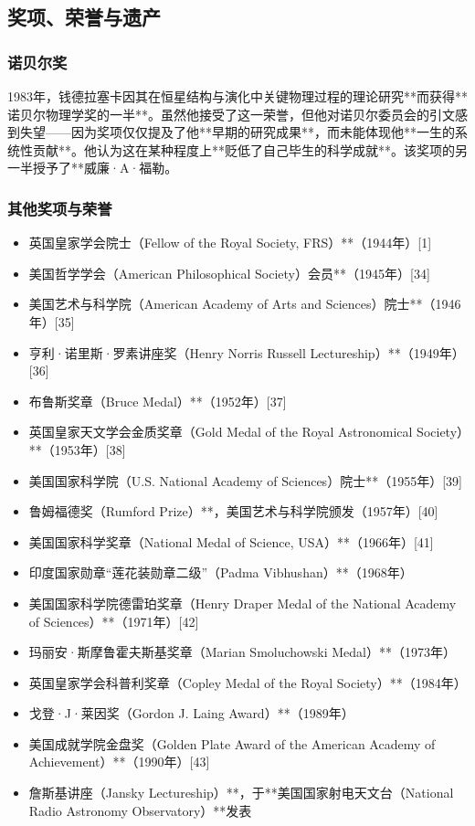 \subsection{奖项、荣誉与遗产}
\subsubsection{诺贝尔奖}
1983年，钱德拉塞卡因其在恒星结构与演化中关键物理过程的理论研究**而获得**诺贝尔物理学奖的一半**。虽然他接受了这一荣誉，但他对诺贝尔委员会的引文感到失望——因为奖项仅仅提及了他**早期的研究成果**，而未能体现他**一生的系统性贡献**。他认为这在某种程度上**贬低了自己毕生的科学成就**。该奖项的另一半授予了**威廉·A·福勒。
\subsubsection{其他奖项与荣誉}
\begin{itemize}
\item 英国皇家学会院士（Fellow of the Royal Society, FRS）**（1944年）[1]
\item 美国哲学学会（American Philosophical Society）会员**（1945年）[34]
\item 美国艺术与科学院（American Academy of Arts and Sciences）院士**（1946年）[35]
\item 亨利·诺里斯·罗素讲座奖（Henry Norris Russell Lectureship）**（1949年）[36]
\item 布鲁斯奖章（Bruce Medal）**（1952年）[37]
\item 英国皇家天文学会金质奖章（Gold Medal of the Royal Astronomical Society）**（1953年）[38]
\item 美国国家科学院（U.S. National Academy of Sciences）院士**（1955年）[39]
\item 鲁姆福德奖（Rumford Prize）**，美国艺术与科学院颁发（1957年）[40]
\item 美国国家科学奖章（National Medal of Science, USA）**（1966年）[41]
\item 印度国家勋章“莲花装勋章二级”（Padma Vibhushan）**（1968年）
\item 美国国家科学院德雷珀奖章（Henry Draper Medal of the National Academy of Sciences）**（1971年）[42]
\item 玛丽安·斯摩鲁霍夫斯基奖章（Marian Smoluchowski Medal）**（1973年）
\item 英国皇家学会科普利奖章（Copley Medal of the Royal Society）**（1984年）
\item 戈登·J·莱因奖（Gordon J. Laing Award）**（1989年）
\item 美国成就学院金盘奖（Golden Plate Award of the American Academy of Achievement）**（1990年）[43]
\item 詹斯基讲座（Jansky Lectureship）**，于**美国国家射电天文台（National Radio Astronomy Observatory）**发表
\end{itemize}
